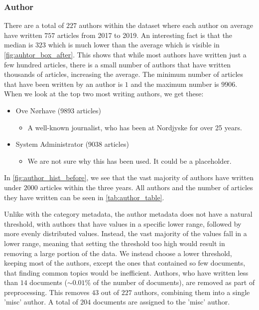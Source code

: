\subsubsection{Author}\label{subsec:appendix_author}
There are a total of $227$ authors within the dataset where each author on average have written $757$ articles from 2017 to 2019.
An interesting fact is that the median is $323$ which is much lower than the average which is visible in \autoref{fig:auhtor_box_after}.
This shows that while most authors have written just a few hundred articles, there is a small number of authors that have written thousands of articles, increasing the average.
The minimum number of articles that have been written by an author is $1$ and the maximum number is $9906$.
When we look at the top two most writing authors, we get these:
\begin{itemize}
	\item Ove Nørhave (9893 articles)
	\begin{itemize}
		\item A well-known journalist, who has been at Nordjyske for over 25 years.
	\end{itemize}
	\item System Administrator (9038 articles)
	\begin{itemize}
		\item We are not sure why this has been used. It could be a placeholder.
	\end{itemize}
\end{itemize}

In \autoref{fig:author_hist_before}, we see that the vast majority of authors have written under $2000$ articles within the three years. 
All authors and the number of articles they have written can be seen in \autoref{tab:author_table}.

Unlike with the category metadata, the author metadata does not have a natural threshold, with authors that have values in a specific lower range, followed by more evenly distributed values.
Instead, the vast majority of the values fall in a lower range, meaning that setting the threshold too high would result in removing a large portion of the data.
We instead choose a lower threshold, keeping most of the authors, except the ones that contained so few documents, that finding common topics would be inefficient.
Authors, who have written less than $14$ documents (${\sim}0.01\%$ of the number of documents), are removed as part of preprocessing.
This removes $43$ out of $227$ authors, combining them into a single 'misc' author.
A total of $204$ documents are assigned to the 'misc' author.

